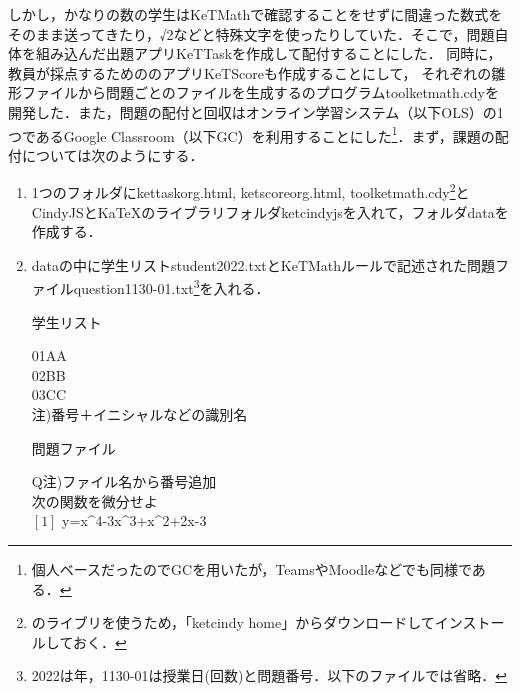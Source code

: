 \documentclass[a4j,12pt]{ujarticle}
\begin{document}
しかし，かなりの数の学生はKeTMathで確認することをせずに間違った数式をそのまま送ってきたり，√2などと特殊文字を使ったりしていた．そこで，問題自体を組み込んだ出題アプリKeTTaskを作成して配付することにした．%
同時に，教員が採点するためののアプリKeTScoreも作成することにして，%
それぞれの雛形ファイルから問題ごとのファイルを生成する\ketcindy のプログラムtoolketmath.cdyを開発した．また，問題の配付と回収はオンライン学習システム（以下OLS）の1つであるGoogle Classroom（以下GC）を利用することにした\footnote{個人ベースだったのでGCを用いたが，TeamsやMoodleなどでも同様である．}．まず，課題の配付については次のようにする．\vspace{-1mm}
\begin{enumerate}
\item 1つのフォルダにkettaskorg.html, ketscoreorg.html, toolketmath.cdy\footnote{\ketcindy のライブリを使うため，「ketcindy home」からダウンロードしてインストールしておく．}とCindyJSとKaTeXのライブラリフォルダketcindyjsを入れて，フォルダdataを作成する．\vspace{-2mm}
\item dataの中に学生リストstudent2022.txtとKeTMathルールで記述された問題ファイルquestion1130-01.txt\footnote{2022は年，1130-01は授業日(回数)と問題番号．以下のファイルでは省略．}を入れる．\vspace{3mm}\\
\begin{minipage}[t]{68mm}
\begin{center}
学生リスト
\end{center}
\hspace*{2zw}01AA\\
\hspace*{2zw}02BB\\
\hspace*{2zw}03CC\\
\hfill{\small 注)番号＋イニシャルなどの識別名}
\end{minipage}\hspace{6mm}%
\begin{minipage}[t]{68mm}
\begin{center}
問題ファイル
\end{center}
\hspace*{2zw}Q\hfill{\small 注)ファイル名から番号追加}\\
\hspace*{2zw}次の関数を微分せよ\\
\hspace*{2zw}$[1]$ y=x\^{}4-3x\^{}3+x\^{}2+2x-3\\

\end{minipage}
\end{enumerate}
\end{document}
